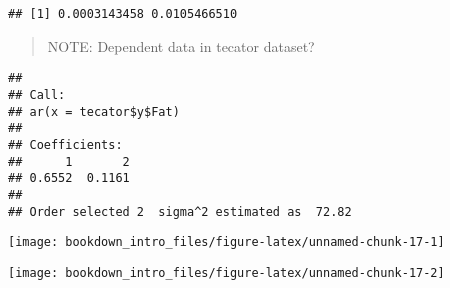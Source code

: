 \documentclass[
]{book}
\newenvironment{Shaded}{\begin{snugshade}}{\end{snugshade}}
\newcommand{\AttributeTok}[1]{\textcolor[rgb]{0.77,0.63,0.00}{#1}}
\newcommand{\CommentTok}[1]{\textcolor[rgb]{0.56,0.35,0.01}{\textit{#1}}}
\newcommand{\DecValTok}[1]{\textcolor[rgb]{0.00,0.00,0.81}{#1}}
\newcommand{\FunctionTok}[1]{\textcolor[rgb]{0.00,0.00,0.00}{#1}}
\newcommand{\NormalTok}[1]{#1}
\newcommand{\SpecialCharTok}[1]{\textcolor[rgb]{0.00,0.00,0.00}{#1}}
\begin{document}
\begin{verbatim}
## [1] 0.0003143458 0.0105466510
\end{verbatim}

\begin{quote}
NOTE: Dependent data in tecator dataset?
\end{quote}

\begin{Shaded}
\end{Shaded}

\begin{verbatim}
## 
## Call:
## ar(x = tecator$y$Fat)
## 
## Coefficients:
##      1       2  
## 0.6552  0.1161  
## 
## Order selected 2  sigma^2 estimated as  72.82
\end{verbatim}

\begin{Shaded}
\end{Shaded}

\begin{center}\texttt{[image: bookdown\_intro\_files/figure-latex/unnamed-chunk-17-1]} \end{center}

\begin{Shaded}
\end{Shaded}

\begin{center}\texttt{[image: bookdown\_intro\_files/figure-latex/unnamed-chunk-17-2]} \end{center}

\begin{Shaded}
\end{Shaded}
\end{document}
